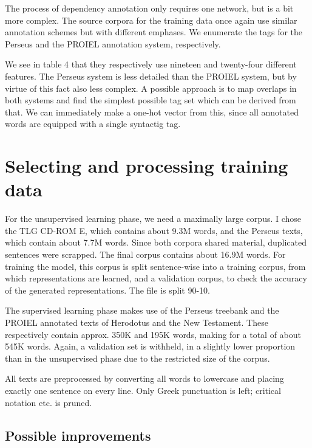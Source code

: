 The process of dependency annotation only requires one network, but is
a bit more complex. The source corpora for the training data once
again use similar annotation schemes but with different emphases. We
enumerate the tags for the Perseus and the PROIEL annotation system,
respectively.

We see in table 4 that they respectively use nineteen and twenty-four different
features. The Perseus system is less detailed than the PROIEL system,
but by virtue of this fact also less complex. A possible approach is
to map overlaps in both systems and find the simplest possible tag set
which can be derived from that. We can immediately make a one-hot
vector from this, since all annotated words are equipped with a single
syntactig tag.

\section{Selecting and processing training data}
\label{sec:trainingdata}

For the unsupervised learning phase, we need a maximally large
corpus. I chose the TLG CD-ROM E, which contains about 9.3M words, and
the Perseus texts, which contain about 7.7M words. Since both corpora
shared material, duplicated sentences were scrapped. The final corpus
contains about 16.9M words. For training the model, this corpus is
split sentence-wise into a training corpus, from which representations
are learned, and a validation corpus, to check the accuracy of the
generated representations. The file is split 90-10.

The supervised learning phase makes use of the Perseus treebank and
the PROIEL annotated texts of Herodotus and the New Testament. These
respectively contain approx. 350K and 195K words, making for a total
of about 545K words. Again, a validation set is withheld, in a
slightly lower proportion than in the unsupervised phase due to the
restricted size of the corpus.

All texts are preprocessed by converting all words to lowercase and
placing exactly one sentence on every line. Only Greek punctuation is
left; critical notation etc. is pruned.

\subsection{Possible improvements}
\label{sec:supervised}



